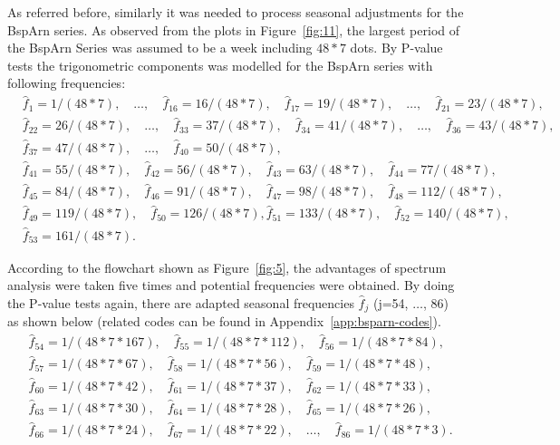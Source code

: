 \documentclass[12pt,msc]{uom_eee_dissertation_casson}
\newcommand{\figref}[1]{Figure~\ref{#1}}
\newcommand{\appref}[1]{Appendix~\ref{#1}}
\begin{document}
As referred before, similarly it was needed to process seasonal adjustments for the BspArn series. As observed from the plots in \figref{fig:11}, the largest period of the BspArn Series was assumed to be a week including $48*7$ dots. By P-value tests the trigonometric components was modelled for the BspArn series with following frequencies:
\begin{equation}
\label{eq:3-1}
\begin{aligned}
&\hat{f}_{1}=1/(48*7),\quad \dots, \quad\hat{f}_{16}=16/(48*7), \quad\hat{f}_{17}=19/(48*7),\quad\dots,\quad\hat{f}_{21}=23/(48*7),\\
&\hat{f}_{22}=26/(48*7),\quad\dots,\quad \hat{f}_{33}=37/(48*7), \quad\hat{f}_{34}=41/(48*7),\quad\dots,\quad\hat{f}_{36}=43/(48*7),\\
&\hat{f}_{37}=47/(48*7),\quad\dots,\quad\hat{f}_{40}=50/(48*7),\\
&\hat{f}_{41}=55/(48*7),\quad\hat{f}_{42}=56/(48*7),\quad \hat{f}_{43}=63/(48*7),\quad \hat{f}_{44}=77/(48*7),\\
&\hat{f}_{45}=84/(48*7),\quad\hat{f}_{46}=91/(48*7),\quad\hat{f}_{47}=98/(48*7),\quad\hat{f}_{48}=112/(48*7),\\
&\hat{f}_{49}=119/(48*7),\quad\hat{f}_{50}=126/(48*7),\hat{f}_{51}=133/(48*7),\quad\hat{f}_{52}=140/(48*7),\\
&\hat{f}_{53}=161/(48*7).
\end{aligned}
\end{equation}

According to the flowchart shown as \figref{fig:5}, the advantages of spectrum analysis were taken five times and potential frequencies were obtained. By doing the P-value tests again, there are adapted seasonal frequencies $\hat{f}_{j}$ (j=54, $\dots$, 86) as shown below (related codes can be found in \appref{app:bsparn-codes}).
\begin{equation}
\label{eq:3-2}
\begin{aligned}
&\hat{f}_{54}=1/(48*7*167),\quad\hat{f}_{55}=1/(48*7*112),\quad\hat{f}_{56}=1/(48*7*84), \\
&\hat{f}_{57}=1/(48*7*67), \quad\hat{f}_{58}=1/(48*7*56), \quad\hat{f}_{59}=1/(48*7*48), \\ &\hat{f}_{60}=1/(48*7*42),\quad\hat{f}_{61}=1/(48*7*37), \quad\hat{f}_{62}=1/(48*7*33), \\
&\hat{f}_{63}=1/(48*7*30),\quad \hat{f}_{64}=1/(48*7*28), \quad \hat{f}_{65}=1/(48*7*26), \\ &\hat{f}_{66}=1/(48*7*24),\quad\hat{f}_{67}=1/(48*7*22),\quad \dots,\quad \hat{f}_{86}=1/(48*7*3).\\
\end{aligned}
\end{equation}
\end{document}
